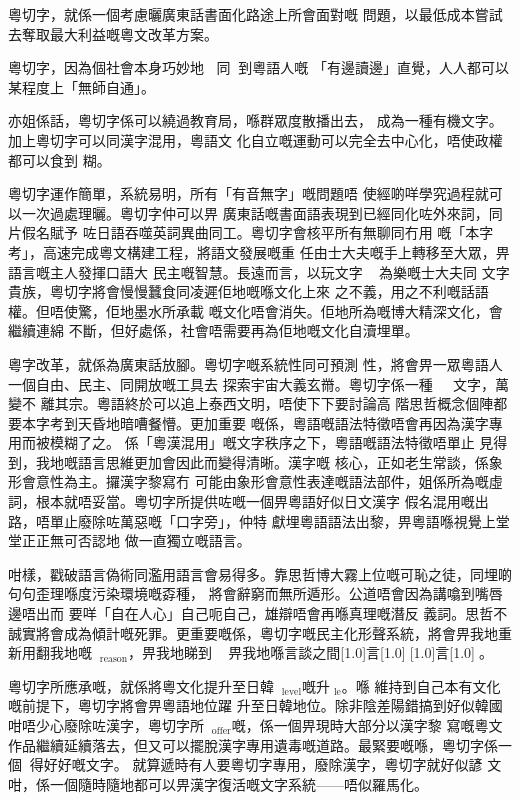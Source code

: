 \documentclass[a5paper, 10pt, openany]{book} %
\begin{document}
粵切字，就係一個考慮曬廣東話書面化路途上所會面對嘅 問題，以最低成本嘗試去奪取最大利益嘅粵文改革方案。

粵切字，因為個社會本身巧妙地 同到粵語人嘅 「有邊讀邊」直覺，人人都可以某程度上「無師自通」。

亦姐係話，粵切字係可以繞過教育局，喺群眾度散播出去， 成為一種有機文字。加上粵切字可以同漢字混用，粵語文 化自立嘅運動可以完全去中心化，唔使政權都可以食到 糊。

粵切字運作簡單，系統易明，所有「有音無字」嘅問題唔 使經啲咩學究過程就可以一次過處理曬。粵切字仲可以畀 廣東話嘅書面語表現到已經同化咗外來詞，同片假名賦予 咗日語吞噬英詞異曲同工。粵切字會核平所有無聊同冇用 嘅「本字考」，高速完成粵文構建工程，將語文發展嘅重 任由士大夫嘅手上轉移至大眾，畀語言嘅主人發揮口語大 民主嘅智慧。長遠而言，以玩文字 為樂嘅士大夫同 文字貴族，粵切字將會慢慢蠶食同凌遲佢地嘅喺文化上來 之不義，用之不利嘅話語權。但唔使驚，佢地墨水所承載 嘅文化唔會消失。佢地所為嘅博大精深文化，會繼續連綿 不斷，但好處係，社會唔需要再為佢地嘅文化自瀆埋單。

粵字改革，就係為廣東話放腳。粵切字嘅系統性同可預測 性，將會畀一眾粵語人一個自由、民主、同開放嘅工具去 探索宇宙大義玄黹。粵切字係一種 文字，萬變不 離其宗。粵語終於可以追上泰西文明，唔使下下要討論高 階思哲概念個陣都要本字考到天昏地暗嘈餐懵。更加重要 嘅係，粵語嘅語法特徵唔會再因為漢字專用而被模糊了之。 係「粵漢混用」嘅文字秩序之下，粵語嘅語法特徵唔單止 見得到，我地嘅語言思維更加會因此而變得清晰。漢字嘅 核心，正如老生常談，係象形會意性為主。攞漢字黎寫冇 可能由象形會意性表達嘅語法部件，姐係所為嘅虛詞，根本就唔妥當。粵切字所提供咗嘅一個畀粵語好似日文漢字 假名混用嘅出路，唔單止廢除咗萬惡嘅「口字旁」，仲特 獻埋粵語語法出黎，畀粵語喺視覺上堂堂正正無可否認地 做一直獨立嘅語言。

咁樣，戳破語言偽術同濫用語言會易得多。靠思哲博大霧上位嘅可恥之徒，同埋啲句句歪理喺度污染環境嘅孬種， 將會辭窮而無所遁形。公道唔會因為講噏到嘴唇邊唔出而 要咩「自在人心」自己呃自己，雄辯唔會再喺真理嘅潛反 義詞。思哲不誠實將會成為傾計嘅死罪。更重要嘅係，粵切字嘅民主化形聲系統，將會畀我地重新用翻我地嘅$_{\text{reason}}$，畀我地睇到 ，畀我地喺言談之間\scalebox{0.5}[1.0]{言}\scalebox{0.5}[1.0]{}\scalebox{0.5}[1.0]{言}\scalebox{0.5}[1.0]{}。

粵切字所應承嘅，就係將粵文化提升至日韓$_{\text{level}}$嘅升$_{\text{le}}$。喺 維持到自己本有文化嘅前提下，粵切字將會畀粵語地位躍 升至日韓地位。除非陰差陽錯搞到好似韓國咁唔少心廢除咗漢字，粵切字所$_{\text{offer}}$嘅，係一個畀現時大部分以漢字黎 寫嘅粵文作品繼續延續落去，但又可以擺脫漢字專用遺毒嘅道路。最緊要嘅喺，粵切字係一個得好好嘅文字。 就算遞時有人要粵切字專用，廢除漢字，粵切字就好似諺 文咁，係一個隨時隨地都可以畀漢字復活嘅文字系統——唔似羅馬化。
\end{document}
